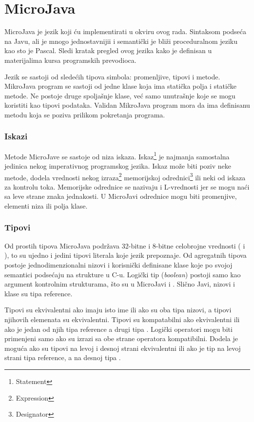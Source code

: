 
\chapter{MicroJava}

MicroJava je jezik koji ću implementirati u okviru ovog rada. 
Sintaksom podseća na Javu, ali je mnogo jednostavnijii i semantički je bliži proceduralnom jeziku kao sto je Pascal. 
Sledi kratak pregled ovog jezika kako je definisan u materijalima kursa programskih prevodioca.

Jezik se sastoji od sledećih tipova simbola: promenljive, tipovi i metode. 
MikroJava program se sastoji od jedne klase koja ima statička polja i statičke metode. 
Ne postoje druge spoljašnje klase, već samo unutrašnje koje se mogu koristiti kao tipovi podataka. 
Validan  MikroJava program mora da ima definisanu metodu  koja se poziva prilikom pokretanja programa.

\subsection*{Iskazi}

Metode MicroJave se sastoje od niza iskaza. 
Iskaz\footnote{\eng Statement} 
	je najmanja samostalna jedinica nekog imperativnog programskog jezika. 
Iskaz može biti poziv neke metode, dodela vrednosti nekog izraza\footnote{\eng Expression} 
	memorijskoj odrednici\footnote{\eng Designator} 
	ili neki od iskaza za kontrolu toka. 
Memorijske odrednice se nazivaju i L-vrednosti jer se mogu naći sa leve strane znaka jednakosti. 
U MicroJavi odrednice mogu biti promenjive, elementi niza ili polja klase.

\subsection*{Tipovi}

Od prostih tipova MicroJava podržava 32-bitne i 8-bitne celobrojne vrednosti ( i ), 
	to su ujedno i jedini tipovi literala koje jezik prepoznaje. 
Od agregatnih tipova postoje jednodimenzionalni nizovi i korisnički definisane klase koje po svojoj semantici podsećaju na strukture u C-u. 
Logički tip (\textit{boolean}) postoji samo kao argument kontrolnim strukturama, što su u MicroJavi  i . 
Slično Javi, nizovi i klase su tipa reference.

Tipovi su ekvivalentni ako imaju isto ime ili ako su oba tipa nizovi, a tipovi njihovih elemenata su ekvivalentni. 
Tipovi su kompatabilni ako ekvivalentni ili ako je jedan od njih tipa reference a drugi tipa . 
Logički operatori mogu biti primenjeni samo ako su izrazi sa obe strane operatora kompatibilni. 
Dodela je moguća ako su tipovi na levoj i desnoj strani ekvivalentni ili ako je tip na levoj strani tipa reference, a na desnoj tipa .

